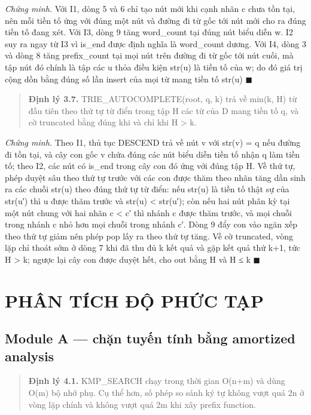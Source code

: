 \emph{Chứng minh.} Với I1, dòng 5 và 6 chỉ tạo nút mới khi cạnh nhãn c
chưa tồn tại, nên mỗi tiền tố ứng với đúng một nút và đường đi từ gốc
tới nút mới cho ra đúng tiền tố đang xét. Với I3, dòng 9 tăng
word\_count tại đúng nút biểu diễn w. I2 suy ra ngay từ I3 vì is\_end
được định nghĩa là word\_count dương. Với I4, dòng 3 và dòng 8 tăng
prefix\_count tại mọi nút trên đường đi từ gốc tới nút cuối, mà tập nút
đó chính là tập các u thỏa điều kiện str(u) là tiền tố của w; do đó giá
trị cộng dồn bằng đúng số lần insert của mọi từ mang tiền tố str(u) \(\blacksquare\)

\begin{quote}
\textbf{Định lý 3.7.} TRIE\_AUTOCOMPLETE(root, q, k) trả về min(k,
\textbar H\textbar) từ đầu tiên theo thứ tự từ điển trong tập H các từ
của D mang tiền tố q, và cờ truncated bằng đúng khi và chỉ khi
\textbar H\textbar{} \textgreater{} k.
\end{quote}

\emph{Chứng minh.} Theo I1, thủ tục DESCEND trả về nút v với str(v) = q
nếu đường đi tồn tại, và cây con gốc v chứa đúng các nút biểu diễn tiền
tố nhận q làm tiền tố; theo I2, các nút có is\_end trong cây con đó ứng
với đúng tập H. Về thứ tự, phép duyệt sâu theo thứ tự trước với các con
được thăm theo nhãn tăng dần sinh ra các chuỗi str(u) theo đúng thứ tự
từ điển: nếu str(u) là tiền tố thật sự của str(u′) thì u được thăm trước
và str(u) \textless{} str(u′); còn nếu hai nút phân kỳ tại một nút chung
với hai nhãn c \textless{} c′ thì nhánh c được thăm trước, và mọi chuỗi
trong nhánh c nhỏ hơn mọi chuỗi trong nhánh c′. Dòng 9 đẩy con vào ngăn
xếp theo thứ tự giảm nên phép pop lấy ra theo thứ tự tăng. Về cờ
truncated, vòng lặp chỉ thoát sớm ở dòng 7 khi đã thu đủ k kết quả và
gặp kết quả thứ k+1, tức \textbar H\textbar{} \textgreater{} k; ngược
lại cây con được duyệt hết, cho out bằng H và \textbar H\textbar{} ≤ k \(\blacksquare\)

\chapter{PHÂN TÍCH ĐỘ PHỨC TẠP}
\label{ch:4}

\section{Module A --- chặn tuyến tính bằng amortized analysis}
\label{sec:4-1}

\begin{quote}
\textbf{Định lý 4.1.} KMP\_SEARCH chạy trong thời gian O(n+m) và dùng
O(m) bộ nhớ phụ. Cụ thể hơn, số phép so sánh ký tự không vượt quá 2n ở
vòng lặp chính và không vượt quá 2m khi xây prefix function.
\end{quote}

